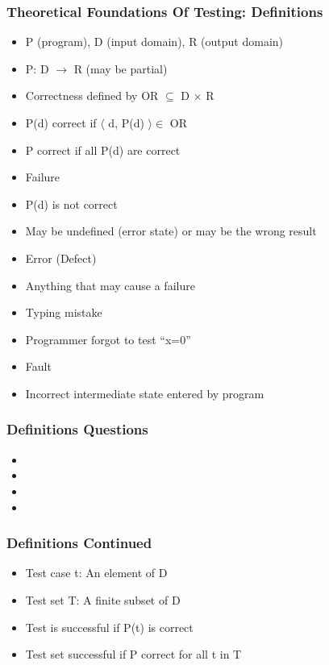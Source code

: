 \documentclass[t,12pt,numbers,fleqn]{beamer}
\begin{document}
\begin{frame}
\frametitle{Theoretical Foundations Of Testing: Definitions}
\begin{itemize}
\item P (program), D (input domain), R (output domain)
\bi
\item P: D $\rightarrow$ R (may be partial)
\ei
\item Correctness defined by OR $\subseteq$ D $\times$ R
\bi
\item P(d) correct if $\langle$ d, P(d) $\rangle \in$ OR
\item P correct if all P(d) are correct
\ei
\item Failure
\bi
\item P(d) is not correct
\item May be undefined (error state) or may be the wrong result
\ei
\item Error (Defect)
\bi
\item Anything that may cause a failure
\bi
\item Typing mistake
\item Programmer forgot to test ``x=0''
\ei
\ei
\item Fault
\bi
\item Incorrect intermediate state entered by program
\ei
\end{itemize}
\end{frame}


\begin{frame}
\frametitle{Definitions Questions}
\begin{itemize}
\item {}
\item {}
\item {}
\item {}
\end{itemize}
\end{frame}


\begin{frame}
\frametitle{Definitions Continued}
\begin{itemize}
\item Test case t: An element of D
\item Test set T: A finite subset of D
\item Test is successful if P(t) is correct
\item Test set successful if P correct for all t in T
\end{itemize}
\end{frame}
\end{document}
